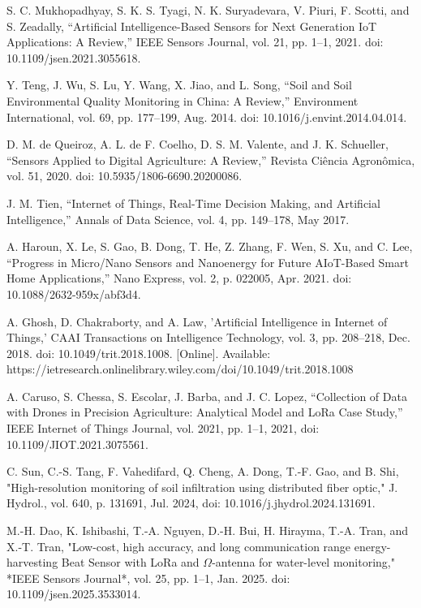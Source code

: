 \documentclass[conference]{IEEEtran}
\begin{document}
\begin{thebibliography}{00}
 S. C. Mukhopadhyay, S. K. S. Tyagi, N. K. Suryadevara, V. Piuri, F. Scotti, and S. Zeadally, 
``Artificial Intelligence-Based Sensors for Next Generation IoT Applications: A Review,'' 
IEEE Sensors Journal, vol. 21, pp. 1--1, 2021. doi: 10.1109/jsen.2021.3055618.

 Y. Teng, J. Wu, S. Lu, Y. Wang, X. Jiao, and L. Song, 
``Soil and Soil Environmental Quality Monitoring in China: A Review,'' 
Environment International, vol. 69, pp. 177--199, Aug. 2014. doi: 10.1016/j.envint.2014.04.014.

 D. M. de Queiroz, A. L. de F. Coelho, D. S. M. Valente, and J. K. Schueller, 
``Sensors Applied to Digital Agriculture: A Review,'' 
Revista Ciência Agronômica, vol. 51, 2020. doi: 10.5935/1806-6690.20200086.

 J. M. Tien, 
``Internet of Things, Real-Time Decision Making, and Artificial Intelligence,'' 
Annals of Data Science, vol. 4, pp. 149--178, May 2017.

 A. Haroun, X. Le, S. Gao, B. Dong, T. He, Z. Zhang, F. Wen, S. Xu, and C. Lee, 
``Progress in Micro/Nano Sensors and Nanoenergy for Future AIoT-Based Smart Home Applications,'' 
Nano Express, vol. 2, p. 022005, Apr. 2021. doi: 10.1088/2632-959x/abf3d4.

 A. Ghosh, D. Chakraborty, and A. Law, 
'Artificial Intelligence in Internet of Things,' 
CAAI Transactions on Intelligence Technology, vol. 3, pp. 208--218, Dec. 2018. doi: 10.1049/trit.2018.1008. [Online]. Available: https://ietresearch.onlinelibrary.wiley.com/doi/10.1049/trit.2018.1008

 A. Caruso, S. Chessa, S. Escolar, J. Barba, and J. C. Lopez, “Collection of Data with Drones in Precision Agriculture: Analytical Model and LoRa Case Study,” IEEE Internet of Things Journal, vol. 2021, pp. 1–1, 2021, doi: 10.1109/JIOT.2021.3075561.

 C. Sun, C.-S. Tang, F. Vahedifard, Q. Cheng, A. Dong, T.-F. Gao, and B. Shi, "High-resolution monitoring of soil infiltration using distributed fiber optic," J. Hydrol., vol. 640, p. 131691, Jul. 2024, doi: 10.1016/j.jhydrol.2024.131691.
 
M.-H. Dao, K. Ishibashi, T.-A. Nguyen, D.-H. Bui, H. Hirayma, T.-A. Tran, and X.-T. Tran, 
"Low-cost, high accuracy, and long communication range energy-harvesting Beat Sensor with LoRa and $\Omega$-antenna for water-level monitoring,"
*IEEE Sensors Journal*, vol. 25, pp. 1--1, Jan. 2025. doi: 10.1109/jsen.2025.3533014.


\end{thebibliography}
\end{document}
